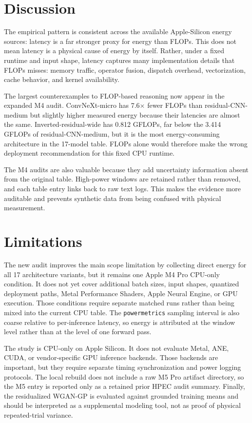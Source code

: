 \documentclass[conference]{IEEEtran}
\begin{document}
\section{Discussion}

The empirical pattern is consistent across the available Apple-Silicon energy
sources: latency is a far stronger proxy for energy than FLOPs. This
does not mean latency is a physical cause of energy by itself. Rather, under a
fixed runtime and input shape, latency captures many implementation details
that FLOPs misses: memory traffic, operator fusion, dispatch overhead,
vectorization, cache behavior, and kernel availability.

The largest counterexamples to FLOP-based reasoning now appear in the expanded
M4 audit. ConvNeXt-micro has 7.6$\times$ fewer FLOPs than residual-CNN-medium
but slightly higher measured energy because their latencies are almost the
same. Inverted-residual-wide has 0.812 GFLOPs, far below the 3.414 GFLOPs of
residual-CNN-medium, but it is the most energy-consuming architecture in the
17-model table. FLOPs alone would therefore make the wrong deployment
recommendation for this fixed CPU runtime.

The M4 audits are also valuable because they add uncertainty information absent
from the original table. High-power windows are retained rather than removed,
and each table entry links back to raw text logs. This makes the evidence more
auditable and prevents synthetic data from being confused with physical
measurement.

\section{Limitations}

The new audit improves the main scope limitation by collecting direct energy
for all 17 architecture variants, but it remains one Apple M4 Pro CPU-only
condition. It does not yet cover additional batch sizes, input shapes,
quantized deployment paths, Metal Performance Shaders, Apple Neural Engine, or
GPU execution. Those conditions require separate matched runs rather than
being mixed into the current CPU table. The \texttt{powermetrics} sampling
interval is also coarse relative to per-inference latency, so energy is
attributed at the window level rather than at the level of one forward pass.

The study is CPU-only on Apple Silicon. It does not evaluate Metal, ANE,
CUDA, or vendor-specific GPU inference backends. Those backends are important,
but they require separate timing synchronization and power logging protocols.
The local rebuild does not include a raw M5 Pro artifact directory, so the M5
entry is reported only as a retained prior HPEC audit summary. Finally, the
residualized WGAN-GP is evaluated against grounded training
means and should be interpreted as a supplemental modeling tool, not as proof
of physical repeated-trial variance.
\end{document}
